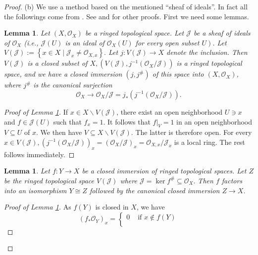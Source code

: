 \documentclass[12pt]{amsart}
\newtheorem{lm}[theorem]{Lemma}
\begin{document}
\begin{proof}
	(b) We use a method based on the mentioned ``sheaf of ideals''. In fact all the followings come from \cite[Chapter 2, Proposition 3.20, P. 47]{LIU}. See \cite[Chapter 3, Theorem 3.42, P. 84]{GW} and \cite[P. 32]{BAG} for other proofs. First we need some lemmas.
	\begin{lm}
		\label{l13}
		Let $\left(X, \mathcal{O}_{X}\right)$ be a ringed topological space. Let $\mathcal{J}$ be a sheaf of ideals of $\mathcal{O}_{X}$ (i.e., $\mathcal{J}(U)$ is an ideal of $\mathcal{O}_{X}(U)$ for every open subset $\left.U\right)$. Let $V(\mathcal{J}):=\left\{x \in X \mid \mathcal{J}_{x} \neq \mathcal{O}_{X, x}\right\} .$ Let $j: V(\mathcal{J}) \rightarrow X$ denote the inclusion. Then $V(\mathcal{J})$ is a closed subset of $X,\left(V(\mathcal{J}), j^{-1}\left(\mathcal{O}_{X} / \mathcal{J}\right)\right)$ is a ringed topological space, and we have a closed immersion $\left(j, j^{\#}\right)$ of this space into $\left(X, \mathcal{O}_{X}\right)$, where $j^{\#}$ is the canonical surjection
		$$
		\mathcal{O}_{X} \rightarrow \mathcal{O}_{X} / \mathcal{J}=j_{*}\left(j^{-1}\left(\mathcal{O}_{X} / \mathcal{J}\right)\right).
		$$
	\end{lm}
	\begin{proof}[Proof of Lemma \ref*{l13}]
		If $x \in X \backslash V(\mathcal{J})$, there exist an open neighborhood $U \ni x$ and $f \in \mathcal{J}(U)$ such that $f_{x}=1$. It follows that $\left.f\right|_{V}=1$ in an open neighborhood $V \subseteq U$ of $x$. We then have $V \subseteq X \backslash V(\mathcal{J})$. The latter is therefore open. For every $x \in V(\mathcal{J}),\left(j^{-1}\left(\mathcal{O}_{X} / \mathcal{J}\right)\right)_{x}=\left(\mathcal{O}_{X} / \mathcal{J}\right)_{x}=\mathcal{O}_{X, x} / \mathcal{J}_{x}$ is a local ring.
		The rest follows immediately.
	\end{proof}
	\begin{lm}
		\label{l14}
		Let $f: Y \rightarrow X$ be a closed immersion of ringed topological spaces. Let $Z$ be the ringed topological space $V(\mathcal{J})$ where $\mathcal{J}=\ker f^{\#} \subseteq \mathcal{O}_{X} .$ Then $f$ factors into an isomorphism $Y \cong Z$ followed by the canonical closed immersion $Z \rightarrow X$.
	\end{lm}
	\begin{proof}[Proof of Lemma \ref*{l14}]
		As $f(Y)$ is closed in $X$, we have
		$$
		\left(f_{*} \mathcal{O}_{Y}\right)_{x}=\left\{\begin{array}{ll}
		0 & \text { if } x \notin f(Y) \\

\end{array}$$
\end{proof}
\end{proof}
\end{document}
